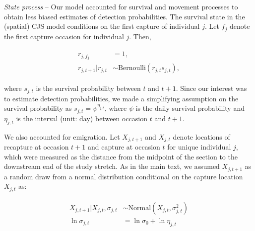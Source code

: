 \documentclass[11pt, class=article, crop=false]{standalone}
\begin{document}



\textit{State process} -- 
Our model accounted for survival and movement processes to obtain less biased estimates of detection probabilities.
The survival state in the (spatial) CJS model conditions on the first capture of individual $j$.
Let $f_{j}$ denote the first capture occasion for individual $j$.
Then,

\begin{align}
    \begin{split}
        r_{j, f_j} &= 1,\\
    r_{j, t + 1} | r_{j, t} &\sim \text{Bernoulli}(r_{j,t} s_{j,t}),    
    \end{split}
\end{align}

where $s_{j,t}$ is the survival probability between $t$ and $t + 1$.
Since our interest was to estimate detection probabilities, we made a simplifying assumption on the survival probability as $s_{j, t} = \psi^{\eta_{j,t}}$, where $\psi$ is the daily survival probability and $\eta_{j,t}$ is the interval (unit: day) between occasion $t$ and $t + 1$.

We also accounted for emigration.
Let $X_{j, t+1}$ and $X_{j, t}$ denote locations of recapture at occasion $t+1$ and capture at occasion $t$ for unique individual $j$, which were measured as the distance from the midpoint of the section to the downstream end of the study stretch.
As in the main text, we assumed $X_{j,t+1}$ as a random draw from a normal distribution conditional on the capture location $X_{j,t}$ as:

\begin{align}
    \begin{split}
        X_{j, t+1}|X_{j, t}, \sigma_{j, t} &\sim \text{Normal}(X_{j, t}, \sigma_{j, t}^2)\\
        \ln \sigma_{j, t} &= \ln \sigma_0 + \ln \eta_{j, t}
    \end{split}
    \label{eq:si-normal}
\end{align}
\end{document}
